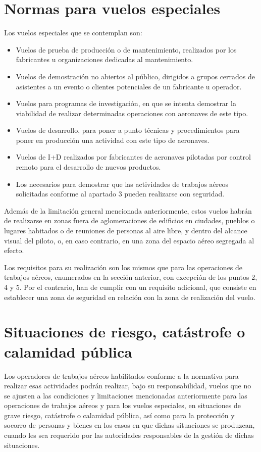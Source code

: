 \section{Normas para vuelos especiales}

Los vuelos especiales que se contemplan son:

\begin{itemize}
\item Vuelos de prueba de producción o de mantenimiento, realizados por los fabricantes u organizaciones dedicadas al mantenimiento.
\item Vuelos de demostración no abiertos al público, dirigidos a grupos cerrados de asistentes a un evento o clientes potenciales de un fabricante u operador.
\item Vuelos para programas de investigación, en que se intenta demostrar la viabilidad de realizar determinadas operaciones con aeronaves de este tipo.
\item Vuelos de desarrollo, para poner a punto técnicas y procedimientos para poner en producción una actividad con este tipo de aeronaves.
\item Vuelos de I+D realizados por fabricantes de aeronaves pilotadas por control remoto para el desarrollo de nuevos productos.
\item Los necesarios para demostrar que las actividades de trabajos aéreos solicitadas conforme al apartado 3 pueden realizarse con seguridad.
\end{itemize}

Además de la limitación general mencionada anteriormente, estos vuelos habrán de realizarse en zonas fuera de aglomeraciones de edificios en ciudades, pueblos o lugares habitados o de reuniones de personas al aire libre, y dentro del alcance visual del piloto, o, en caso contrario, en una zona del espacio aéreo segregada al efecto.

Los requisitos para su realización son los mismos que para las operaciones de trabajos aéreos, enumerados en la sección anterior, con excepción de los puntos 2, 4 y 5. Por el contrario, han de cumplir con un requisito adicional, que consiste en establecer una zona de seguridad en relación con la zona de realización del vuelo.

\section{Situaciones de riesgo, catástrofe o calamidad pública}

Los operadores de trabajos aéreos habilitados conforme a la normativa para realizar esas actividades podrán realizar, bajo su responsabilidad, vuelos que no se ajusten a las condiciones y limitaciones mencionadas anteriormente para las operaciones de trabajos aéreos y para los vuelos especiales, en situaciones de grave riesgo, catástrofe o calamidad pública, así como para la protección y socorro de personas y bienes en los casos en que dichas situaciones se produzcan, cuando les sea requerido por las autoridades responsables de la gestión de dichas situaciones.

